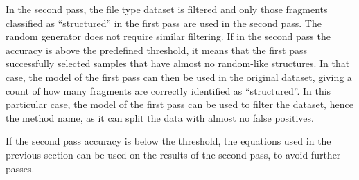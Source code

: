 In the second pass, the file type dataset is filtered and only those fragments classified as ``structured'' in the first pass are used in the second pass. The random generator does not require similar filtering. If in the second pass the accuracy is above the predefined threshold, it means that the first pass successfully selected samples that have almost no random-like structures. In that case, the model of the first pass can then be used in the original dataset, giving a count of how many fragments are correctly identified as ``structured''. In this particular case, the model of the first pass can be used to filter the dataset, hence the method name, as it can split the data with almost no false positives.

If the second pass accuracy is below the threshold, the equations used in the previous section can be used on the results of the second pass, to avoid further passes.

